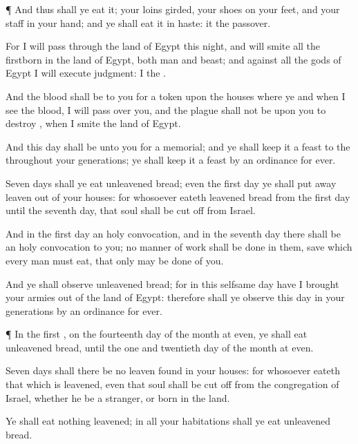 {\par }{\PP {}¶ And
thus shall ye
eat it;
{} your
loins
girded, your
shoes on your
feet, and your
staff in your
hand; and ye shall
eat it in
haste: it
{} the
{}
passover.

For I will
pass through the
land of
Egypt this
night, and will
smite all the
firstborn in the
land of
Egypt, both
man and
beast; and against all the
gods of
Egypt I will
execute
judgment: I
{} the
{}.

And the
blood shall be to you for a
token upon the
houses where ye
{} and when I
see the
blood, I will
pass over you, and the
plague shall not be upon you to
destroy
{}, when I
smite the
land of
Egypt.

And this
day shall be unto you for a
memorial; and ye shall
keep it a
feast to the
{} throughout your
generations; ye shall keep it a
feast by an
ordinance for
ever.

Seven
days shall ye
eat unleavened
bread;
even the
first
day ye shall put
away
leaven out of your
houses: for whosoever
eateth leavened
bread from the
first
day until the
seventh
day, that
soul shall be
cut off from
Israel.

And in the
first
day
{} an
holy
convocation, and in the
seventh
day there shall be an
holy
convocation to you; no manner of
work shall be
done in them,
save
{} which every
man must
eat, that only may be
done of you.

And ye shall
observe
{} unleavened
bread; for in this
selfsame
day have I
brought your
armies out of the
land of
Egypt: therefore shall ye
observe this
day in your
generations by an
ordinance for
ever.


\par }{\PP {}¶ In the
first
{}, on the
fourteenth
day of the
month at
even, ye shall
eat unleavened
bread, until the
one and
twentieth
day of the
month at
even.

Seven
days shall there be no
leaven
found in your
houses: for whosoever
eateth that which is
leavened, even that
soul shall be cut
off from the
congregation of
Israel, whether he be a
stranger, or
born in the
land.

Ye shall
eat nothing
leavened; in all your
habitations shall ye
eat unleavened
bread.


}

